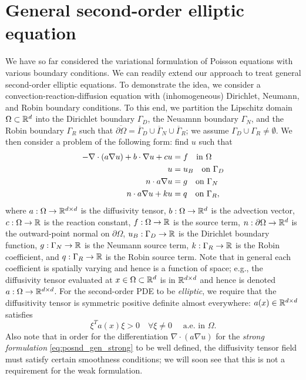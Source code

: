 


\section{General second-order elliptic equation}
We have so far considered the variational formulation of Poisson equations with various boundary conditions. We can readily extend our approach to treat general second-order elliptic equations. To demonstrate the idea, we consider a convection-reaction-diffusion equation with (inhomogeneous) Dirichlet, Neumann, and Robin boundary conditions. To this end, we partition the Lipschitz domain $\Omega \subset \mathbb{R}^d$ into the Dirichlet boundary $\Gamma_D$, the Neuamnn boundary $\Gamma_N$, and the Robin boundary $\Gamma_R$ such that $\overline{\partial \Omega} = \overline{\Gamma}_D \cup \overline{\Gamma}_N \cup \overline{\Gamma}_R$; we assume $\Gamma_D \cup \Gamma_R \neq \emptyset$. We then consider a problem of the following form: find $u$ such that
\begin{align}
  - \nabla \cdot (a \nabla u) + b \cdot \nabla u + c u &= f \quad \text{in } \Omega
  \notag \\
  u &= u_B \quad \text{on } \Gamma_D \label{eq:posnd_gen_strong} \\
  n \cdot a \nabla u &= g \quad \text{on } \Gamma_N \notag \\
  n \cdot a \nabla u + k u &= q \quad \text{on } \Gamma_R, \notag
\end{align}
where $a: \Omega \to \mathbb{R}^{d \times d}$ is the diffusivity tensor, $b: \Omega \to \mathbb{R}^d$ is the advection vector, $c: \Omega \to \mathbb{R}$ is the reaction constant, $f: \Omega \to \mathbb{R}$ is the source term,  $n: \partial \Omega \to \mathbb{R}^d$ is the outward-point normal on $\partial \Omega$, $u_B: \Gamma_D \to \mathbb{R}$ is the Dirichlet boundary function, $g: \Gamma_N \to \mathbb{R}$ is the Neumann source term, $k: \Gamma_R \to \mathbb{R}$ is the Robin coefficient, and $q: \Gamma_R \to \mathbb{R}$ is the Robin source term.  Note that in general each coefficient is spatially varying and hence is a function of space; e.g., the diffusivity tensor evaluated at $x \in \Omega \subset \mathbb{R}^d$ is in $\mathbb{R}^{d \times d}$ and hence is denoted $a: \Omega \to \mathbb{R}^{d \times d}$.  For the second-order PDE to be \emph{elliptic}, we require that the diffusitivity tensor is symmetric positive definite almost everywhere: $a(x) \in \mathbb{R}^{d \times d}$ satisfies
\begin{equation*}
  \xi^T a(x) \xi > 0 \quad \forall \xi \neq 0 \quad \text{ a.e. in } \Omega.
\end{equation*}
Also note that in order for the differentiation $\nabla \cdot ( a \nabla u)$ for the \emph{strong formulation} \eqref{eq:posnd_gen_strong} to be well defined, the diffusivity tensor field must satisfy certain smoothness conditions; we will soon see that this is not a requirement for the weak formulation.

